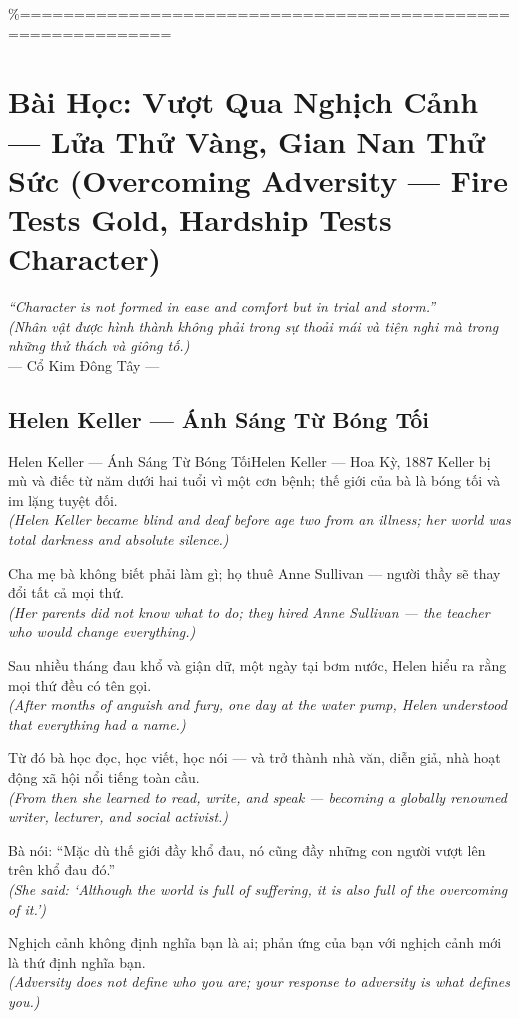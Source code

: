 \%============================================================
\chapter{Bài Học: Vượt Qua Nghịch Cảnh --- Lửa Thử Vàng, Gian Nan Thử Sức (Overcoming Adversity --- Fire Tests Gold, Hardship Tests Character)}
\begin{center}
  \textit{\color{truyengold}``Character is not formed in ease and comfort but in trial and storm.''}\\[4pt]
  \textit{(Nhân vật được hình thành không phải trong sự thoải mái và tiện nghi mà trong những thử thách và giông tố.)}\\[4pt]
  \small\color{truyenblue}--- Cổ Kim Đông Tây ---
\end{center}
\ngancach

\section{Helen Keller --- Ánh Sáng Từ Bóng Tối}
\begin{truyen}{Helen Keller --- Ánh Sáng Từ Bóng Tối}{Helen Keller --- Hoa Kỳ, 1887}
 Keller bị mù và điếc từ năm dưới hai tuổi vì một cơn bệnh; thế giới của bà là bóng tối và im lặng tuyệt đối.\\[4pt]
\textit{(Helen Keller became blind and deaf before age two from an illness; her world was total darkness and absolute silence.)}

Cha mẹ bà không biết phải làm gì; họ thuê Anne Sullivan --- người thầy sẽ thay đổi tất cả mọi thứ.\\[4pt]
\textit{(Her parents did not know what to do; they hired Anne Sullivan --- the teacher who would change everything.)}

Sau nhiều tháng đau khổ và giận dữ, một ngày tại bơm nước, Helen hiểu ra rằng mọi thứ đều có tên gọi.\\[4pt]
\textit{(After months of anguish and fury, one day at the water pump, Helen understood that everything had a name.)}

Từ đó bà học đọc, học viết, học nói --- và trở thành nhà văn, diễn giả, nhà hoạt động xã hội nổi tiếng toàn cầu.\\[4pt]
\textit{(From then she learned to read, write, and speak --- becoming a globally renowned writer, lecturer, and social activist.)}

Bà nói: ``Mặc dù thế giới đầy khổ đau, nó cũng đầy những con người vượt lên trên khổ đau đó.''\\[4pt]
\textit{(She said: `Although the world is full of suffering, it is also full of the overcoming of it.')}

\end{truyen}
\begin{baihoc}
  Nghịch cảnh không định nghĩa bạn là ai; phản ứng của bạn với nghịch cảnh mới là thứ định nghĩa bạn.\\[4pt]
  \textit{(Adversity does not define who you are; your response to adversity is what defines you.)}
\end{baihoc}

